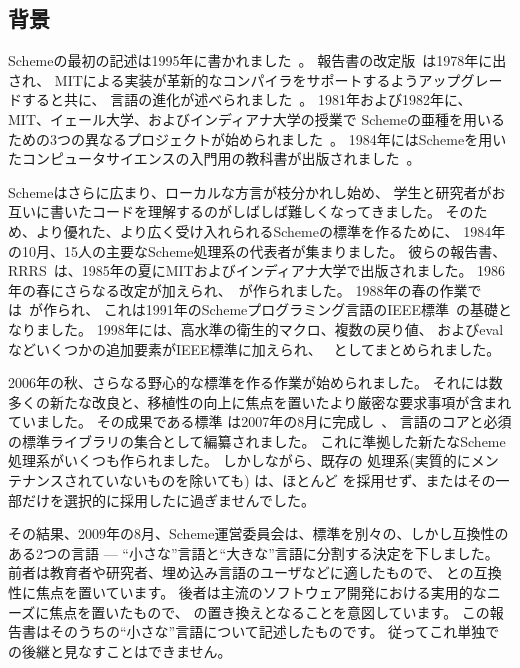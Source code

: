 \subsection*{背景}

\vest Schemeの最初の記述は1995年に書かれました~\cite{Scheme75}。
報告書の改定版~\cite{Scheme78}は1978年に出され、
MITによる実装が革新的なコンパイラをサポートするようアップグレードすると共に、
言語の進化が述べられました~\cite{Rabbit}。
1981年および1982年に、MIT、イェール大学、およびインディアナ大学の授業で
Schemeの亜種を用いるための3つの異なるプロジェクトが始められました~\cite{Rees82,MITScheme,Scheme311}。
1984年にはSchemeを用いたコンピュータサイエンスの入門用の教科書が出版されました~\cite{SICP}。

\vest Schemeはさらに広まり、ローカルな方言が枝分かれし始め、
学生と研究者がお互いに書いたコードを理解するのがしばしば難しくなってきました。
そのため、より優れた、より広く受け入れられるSchemeの標準を作るために、
1984年の10月、15人の主要なScheme処理系の代表者が集まりました。
彼らの報告書、RRRS~\cite{RRRS}は、1985年の夏にMITおよびインディアナ大学で出版されました。
1986年の春にさらなる改定が加えられ、\rthreers~\cite{R3RS}が作られました。
1988年の春の作業では\rfourrs~\cite{R4RS}が作られ、
これは1991年のSchemeプログラミング言語のIEEE標準~\cite{IEEEScheme}の基礎となりました。
1998年には、高水準の衛生的マクロ、複数の戻り値、
およびevalなどいくつかの追加要素がIEEE標準に加えられ、
\rfivers~\cite{R5RS}としてまとめられました。


2006年の秋、さらなる野心的な標準を作る作業が始められました。
それには数多くの新たな改良と、移植性の向上に焦点を置いたより厳密な要求事項が含まれていました。
その成果である標準 \rsixrs は2007年の8月に完成し~\cite{R6RS}、
言語のコアと必須の標準ライブラリの集合として編纂されました。
これに準拠した新たなScheme処理系がいくつも作られました。
しかしながら、既存の \rsixrs 処理系(実質的にメンテナンスされていないものを除いても)
は、ほとんど \rsixrs を採用せず、またはその一部だけを選択的に採用したに過ぎませんでした。

その結果、2009年の8月、Scheme運営委員会は、標準を別々の、しかし互換性のある2つの言語
--- ``小さな''言語と``大きな''言語に分割する決定を下しました。
前者は教育者や研究者、埋め込み言語のユーザなどに適したもので、
\rfivers との互換性に焦点を置いています。
後者は主流のソフトウェア開発における実用的なニーズに焦点を置いたもので、
\rsixrs の置き換えとなることを意図しています。
この報告書はそのうちの``小さな''言語について記述したものです。
従ってこれ単独で \rsixrs の後継と見なすことはできません。




